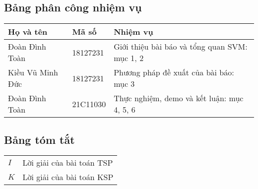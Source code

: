 

\subsection*{Bảng phân công nhiệm vụ}
\begin{tabularx}{\textwidth}{|l|l|X|}
\hline
  \textbf{Họ và tên} & \textbf{Mã số} & \textbf{Nhiệm vụ}\\
\hline
    Đoàn Đình Toàn & 18127231 & {Giới thiệu bài báo và tổng quan SVM: mục 1, 2}\\
\hline
    Kiều Vũ Minh Đức & 18127231 & {Phương pháp đề xuất của bài báo: mục 3}\\
\hline
    Đoàn Đình Toàn & 21C11030 & {Thực nghiệm, demo và kết luận: mục 4, 5, 6}\\
\hline
\end{tabularx}


\subsection*{Bảng tóm tắt}
\begin{table}[H]
\centering
\begin{tabular}{ll}

$I$               & Lời giải của bài toán TSP    \\ 
$K$               & Lời giải của bài toán KSP    \\ 

\end{tabular}
\label{tab:math_annotate}
\end{table}

\pagebreak


\listoftables
{}


\listoffigures
{}

